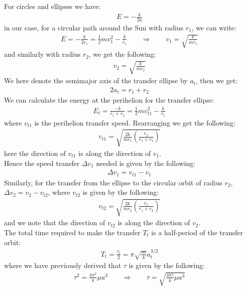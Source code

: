 \documentclass[11pt,oneside]{book}
\theoremstyle{break}
\theoremstyle{break}
\begin{document}
For circles and ellipses we have:
\begin{align*}
E = -\frac{k}{2a}
\end{align*}
in our case, for a circular path around the Sun with radius $r_1$, we can write:
\begin{align*}
E = -\frac{k}{2r_1} = \frac{1}{2}mv_1^2 - \frac{k}{r_1}\qquad \Rightarrow \qquad v_1 = \sqrt{\frac{k}{mr_1}}
\end{align*}
and similarly with radius $r_2$, we get the following:
\begin{align*}
v_2 = \sqrt{\frac{k}{mr_2}}
\end{align*}
We here denote the semimajor axis of the transfer ellipse by $a_t$, then we get:
\begin{align*}
2a_t = r_1 +r_2
\end{align*}
We can calculate the energy at the perihelion for the transfer ellipse:
\begin{align*}
E_t = \frac{-k}{r_1 + r_2} = \frac{1}{2}mv_{t1}^2 - \frac{k}{r_1}
\end{align*}
where $v_{t1}$ is the perihelion transfer speed. Rearranging we get the following:
\begin{align*}
v_{t1} = \sqrt{\frac{2k}{mr_1}\left( \frac{r_2}{r_1 + r_2}\right)}
\end{align*}
here the direction of $v_{t1}$ is along the direction of $v_1$. \\
Hence the speed transfer $\Delta v_1$ needed is given by the following:
\begin{align*}
\Delta v_1 = v_{t1} - v_1
\end{align*}
Similarly, for the transfer from the ellipse to the circular orbit of radius $r_2$, $\Delta v_2 = v_2 - v_{t2}$, where $v_{t2}$ is given by the following:
\begin{align*}
v_{t2} = \sqrt{\frac{2k}{mr_2}\left( \frac{r_1}{r_1 + r_2}\right)}
\end{align*}
and we note that the direction of $v_{t2}$ is along the direction of $v_2$. \\

The total time required to make the transfer $T_t$ is a half-period of the transfer orbit:
\begin{align*}
T_t = \frac{\tau_t}{2} = \pi \sqrt{\frac{m}{k}} a_t^{3/2}
\end{align*}
where we have previously derived that $\tau$ is given by the following:
\begin{align*}
\tau^2 = \frac{4\pi^2}{k}\mu a^3 \qquad \Rightarrow \qquad \tau  = \sqrt{\frac{4\pi^2}{k}\mu a^3 }
\end{align*}
\end{document}
